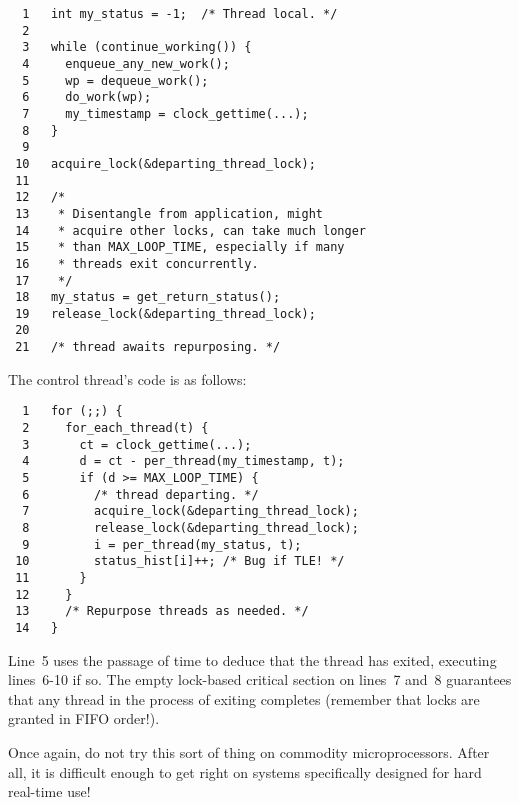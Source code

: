 {	\vspace{5pt}
	\begin{minipage}[t]{\columnwidth}
	\scriptsize
\begin{verbatim}
  1   int my_status = -1;  /* Thread local. */
  2 
  3   while (continue_working()) {
  4     enqueue_any_new_work();
  5     wp = dequeue_work();
  6     do_work(wp);
  7     my_timestamp = clock_gettime(...);
  8   }
  9 
 10   acquire_lock(&departing_thread_lock);
 11 
 12   /*
 13    * Disentangle from application, might
 14    * acquire other locks, can take much longer
 15    * than MAX_LOOP_TIME, especially if many
 16    * threads exit concurrently.
 17    */
 18   my_status = get_return_status();
 19   release_lock(&departing_thread_lock);
 20 
 21   /* thread awaits repurposing. */
\end{verbatim}
	\end{minipage}
	\vspace{5pt}

	The control thread's code is as follows:

	\vspace{5pt}
	\begin{minipage}[t]{\columnwidth}
	\scriptsize
\begin{verbatim}
  1   for (;;) {
  2     for_each_thread(t) {
  3       ct = clock_gettime(...);
  4       d = ct - per_thread(my_timestamp, t);
  5       if (d >= MAX_LOOP_TIME) {
  6         /* thread departing. */
  7         acquire_lock(&departing_thread_lock);
  8         release_lock(&departing_thread_lock);
  9         i = per_thread(my_status, t);
 10         status_hist[i]++; /* Bug if TLE! */
 11       }
 12     }
 13     /* Repurpose threads as needed. */
 14   }
\end{verbatim}
	\end{minipage}
	\vspace{5pt}

	Line~5 uses the passage of time to deduce that the thread
	has exited, executing lines~6-10 if so.
	The empty lock-based critical section on lines~7 and~8
	guarantees that any thread in the process of exiting
	completes (remember that locks are granted in FIFO order!).

	Once again, do not try this sort of thing on commodity
	microprocessors.
	After all, it is difficult enough to get right on systems
	specifically designed for hard real-time use!
} \QuickQuizEnd

